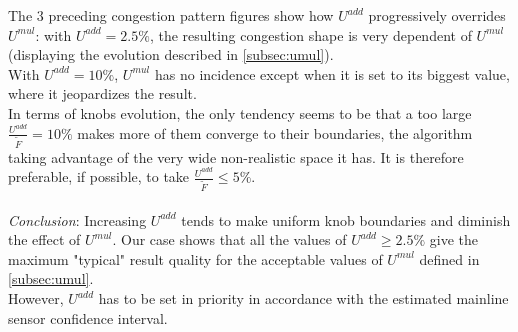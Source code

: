 \newpage

The $3$ preceding congestion pattern figures show how $U^{add}$ progressively overrides $U^{mul}$: with $U^{add}=2.5\% $, the resulting congestion shape is very dependent of $U^{mul}$ (displaying the evolution described in \ref{subsec:umul}).\\
With $U^{add}=10\% $, $U^{mul}$ has no incidence except when it is set to its biggest value, where it jeopardizes the result.\\


In terms of knobs evolution, the only tendency seems to be that a too large $\frac{U^{add}}{\widetilde{F}}=10\% $ makes more of them converge to their boundaries, the algorithm taking advantage of the very wide non-realistic space it has. It is therefore preferable, if possible, to take $\frac{U^{add}}{\widetilde{F}}\leq 5\% $.\\
\\
\emph{Conclusion}: Increasing $U^{add}$ tends to make uniform knob boundaries and diminish the effect of $U^{mul}$. Our case shows that all the values of $U^{add}\geq 2.5 \% $ give the maximum "typical" result quality for the acceptable values of $U^{mul}$ defined in \ref{subsec:umul}. \\
However, $U^{add}$ has to be set in priority in accordance with the estimated mainline sensor confidence interval.
